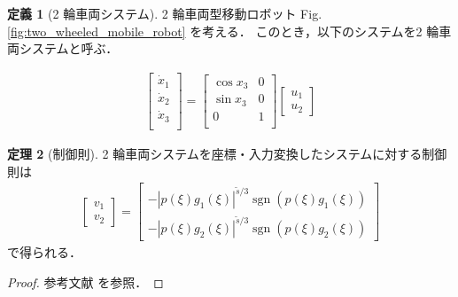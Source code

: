\documentclass[twocolumn]{jarticle}
\newcommand{\figref}[1]{Fig.\,\ref{#1}}
\newcommand{\sgn}{\operatorname{sgn}}
\theoremstyle{definition}
\newtheorem{definition}{定義}
\newtheorem{theorem}[definition]{定理}
\begin{document}
\begin{definition}[2 輪車両システム]
  \label{def:system}
  2 輪車両型移動ロボット \figref{fig:two_wheeled_mobile_robot} を考える．
  このとき，以下のシステムを2 輪車両システムと呼ぶ．

  \begin{align}
    \left[
      \begin{array}{c}
      \dot x_1 \\
      \dot x_2 \\
      \dot x_3 \\
      \end{array}
    \right]
    =
    \left[
      \begin{array}{cc}
      \cos x_3 & 0\\
      \sin x_3 & 0\\
      0 & 1 \\
      \end{array}
    \right]
    \left[
    \begin{array}{cc}
    u_1 \\
    u_2
    \end{array}
    \right]
    \label{system:two_wheeled_mobile_robot}
  \end{align}
\end{definition}

\begin{theorem}[制御則]
  \label{theo:controller}
  2 輪車両システムを座標・入力変換したシステムに対する制御則は
  \begin{align}
    \left[
      \begin{array}{c}
        v_1 \\
        v_2
      \end{array}
    \right]
    = 
    \left[
    \begin{array}{c}
      - \left| p(\xi) g_1(\xi) \right|^{\tilde s/ 3} \sgn \left( p(\xi) g_1(\xi) \right) \\
      - \left| p(\xi) g_2(\xi) \right|^{\tilde s/ 3} \sgn \left( p(\xi) g_2(\xi) \right)
    \end{array}
    \right]
    \label{eq:controller}
  \end{align}
  で得られる．
\end{theorem}

\begin{proof}
  参考文献\cite{kimura2022} を参照．
\end{proof}
\end{document}
